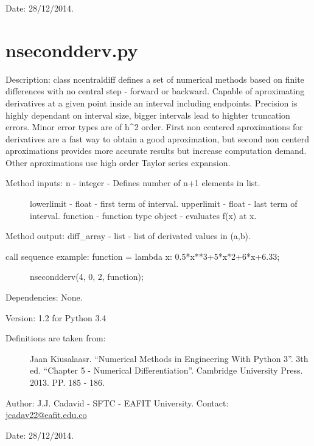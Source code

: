 \documentclass[letterpaper,10pt,oneside]{sphinxmanual}
\theoremstyle{plain}%
\theoremstyle{definition}%
\theoremstyle{remark}%
\begin{document}
Date: 28/12/2014.


\section{nsecondderv.py}
\label{code:module-nsecondderv}\label{code:nsecondderv-py}
Description: class ncentraldiff defines a set of numerical methods based on
finite differences with no central step - forward or backward. Capable of
aproximating derivatives at a given point inside an interval including 
endpoints. Precision is highly dependant on interval size, bigger intervals
lead to highter truncation errors. Minor error types are of h\textasciicircum{}2 order. First
non centered aproximations for derivatives are a fast way to obtain a good
aproximation, but second non centerd aproximations provides more accurate
results but increase computation demand. Other aproximations use high order
Taylor series expansion.
\begin{description}
\item[{Method inputs: n - integer - Defines number of n+1 elements in list.}] \leavevmode
lowerlimit - float - first term of interval.
upperlimit - float - last term of interval.
function - function type object - evaluates f(x) at x.

\end{description}

Method output: diff\_array - list - list of derivated values in (a,b).
\begin{description}
\item[{call sequence example: function = lambda x: 0.5*x**3+5*x*2+6*x+6.33;}] \leavevmode
nsecondderv(4, 0, 2, function);

\end{description}

Dependencies: None.

Version: 1.2 for Python 3.4
\begin{description}
\item[{Definitions are taken from:}] \leavevmode
Jaan Kiusalaasr. ``Numerical Methods in Engineering With Python 3''.
3th ed. ``Chapter 5 - Numerical Differentiation''. 
Cambridge University Press. 2013. PP. 185 - 186.

\end{description}

Author: J.J. Cadavid - SFTC - EAFIT University.
Contact: \href{mailto:jcadav22@eafit.edu.co}{jcadav22@eafit.edu.co}

Date: 28/12/2014.
\end{document}
